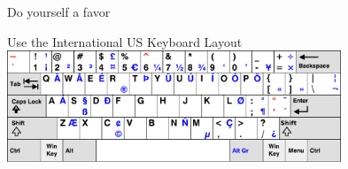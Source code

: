 \documentclass[xetex, onlymath, handout]{beamer}
\begin{document}
\begin{frame}{Do yourself a favor}
  \begin{alertblock}{Use the International US Keyboard Layout}
    \centering
    \vspace{3pt}
    \includegraphics[height=9em]{figs/kbd-us-intl}
  \end{alertblock}
\end{frame}
\end{document}

